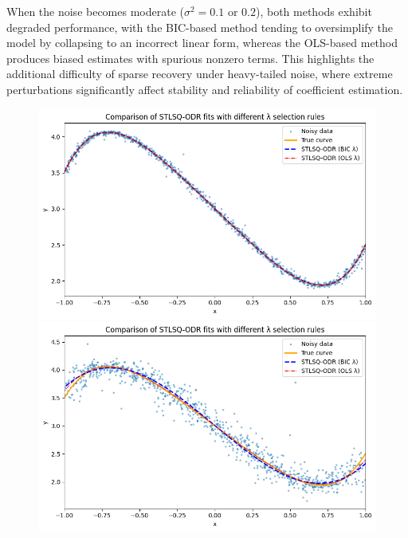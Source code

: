 When the noise becomes moderate ($\sigma^2 = 0.1$ or $0.2$), both methods exhibit degraded performance, with the BIC-based method tending to oversimplify the model by collapsing to an incorrect linear form, whereas the OLS-based method produces biased estimates with spurious nonzero terms. This highlights the additional difficulty of sparse recovery under heavy-tailed noise, where extreme perturbations significantly affect stability and reliability of coefficient estimation.

\begin{figure}[htbp]
\centering
\begin{minipage}{0.45\textwidth}
    \centering
    \includegraphics[width=\linewidth]{MSc_Statistics_Research_Report_Template/images/t10.01,0.01.png}
\end{minipage}
\begin{minipage}{0.45\textwidth}
    \centering
    \includegraphics[width=\linewidth]{MSc_Statistics_Research_Report_Template/images/t 0.05,0.05.png}
\end{minipage}


\end{figure}
